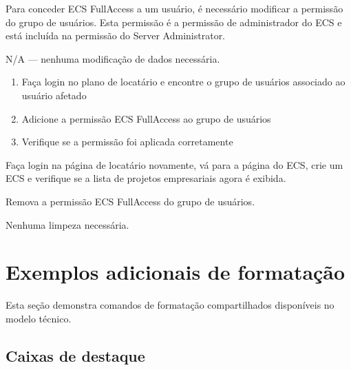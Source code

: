 \documentclass[portuguese]{technical}
\begin{document}
\begin{workaround}

  \begin{impact}
  Para conceder ECS FullAccess a um usuário, é necessário modificar
  a permissão do grupo de usuários. Esta permissão é a permissão de
  administrador do ECS e está incluída na permissão do Server
  Administrator.
  \end{impact}

  \begin{backupdata}
  N/A --- nenhuma modificação de dados necessária.
  \end{backupdata}

  \begin{workaroundsteps}
  \begin{enumerate}
    \item Faça login no plano de locatário e encontre o grupo de
      usuários associado ao usuário afetado
    \item Adicione a permissão ECS FullAccess ao grupo de usuários
    \item Verifique se a permissão foi aplicada corretamente
  \end{enumerate}
  \end{workaroundsteps}

  \begin{verification}
  Faça login na página de locatário novamente, vá para a página do
  ECS, crie um ECS e verifique se a lista de projetos empresariais
  agora é exibida.
  \end{verification}

  \begin{rollback}
  Remova a permissão ECS FullAccess do grupo de usuários.
  \end{rollback}

  \begin{cleanup}
  Nenhuma limpeza necessária.
  \end{cleanup}

\end{workaround}

\section{Exemplos adicionais de formatação}

Esta seção demonstra comandos de formatação compartilhados disponíveis no modelo técnico.

\subsection{Caixas de destaque}
\end{document}
